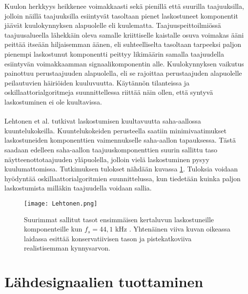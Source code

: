 \documentclass[finnish,12pt,a4paper,pdftex]{article} %
\begin{document}
Kuulon herkkyys heikkenee voimakkaasti sekä pienillä että suurilla taajuuksilla, jolloin näillä taajuuksilla esiintyvät tasoltaan pienet laskostuneet komponentit jäävät kuulokynnyksen alapuolelle eli kuulematta. Taajuuspeittoilmiössä taajuusalueella lähekkäin oleva samalle kriittiselle kaistalle osuva voimakas ääni peittää itseään hiljaisemman äänen, eli suhteelliselta tasoltaan tarpeeksi paljon pienempi laskostunut komponentti peittyy likimäärin samalla taajuudella esiintyvän voimakkaamman signaalikomponentin alle. Kuulokynnyksen vaikutus painottuu perustaajuuden alapuolella, eli se rajoittaa perustaajuden alapuolelle peilautuvien häiriöiden kuuluvuutta. Käytännön tilanteissa ja oskillaattorialgoritmeja suunnittellessa riittää näin ollen, että syntyvä laskostuminen ei ole kuultavissa. \cite{Pekonen2014} \\\\
Lehtonen et al. tutkivat laskostumisen kuultavuutta saha-aallossa kuuntelukokeilla. Kuuntelukokeiden perusteella saatiin minimivaatimukset laskostuneiden komponenttien vaimennukselle saha-aallon tapauksessa. Tästä saadaan edelleen saha-aallon taajuuskomponenttien suurin sallittu taso näytteenottotaajuuden yläpuolella, jolloin vielä laskostuminen pysyy kuulumattomissa. Tutkimuksen tulokset nähdään kuvassa \ref{fig:lehtonen}. Tuloksia voidaan hyödyntää oskillaattorialgoritmien suunnittelussa, kun tiedetään kuinka paljon laskostumista milläkin taajuudella voidaan sallia. \cite{Lehtonen2012}
\vspace{3mm}
\begin{figure}[h] 
\begin{center} 
\texttt{[image: Lehtonen.png]}
\caption{Suurimmat sallitut tasot ensimmäisen kertaluvun laskostuneille komponenteille kun $f_s = 44,1$ kHz \cite[Kuva 3]{Lehtonen2012}. Yhtenäinen viiva kuvan oikeassa laidassa esittää konservatiivisen tason ja pistekatkoviiva realistisemman kynnysarvon.} 
\label{fig:lehtonen}
\end{center}
\end{figure}	

\clearpage


\section{Lähdesignaalien tuottaminen}
\end{document}

